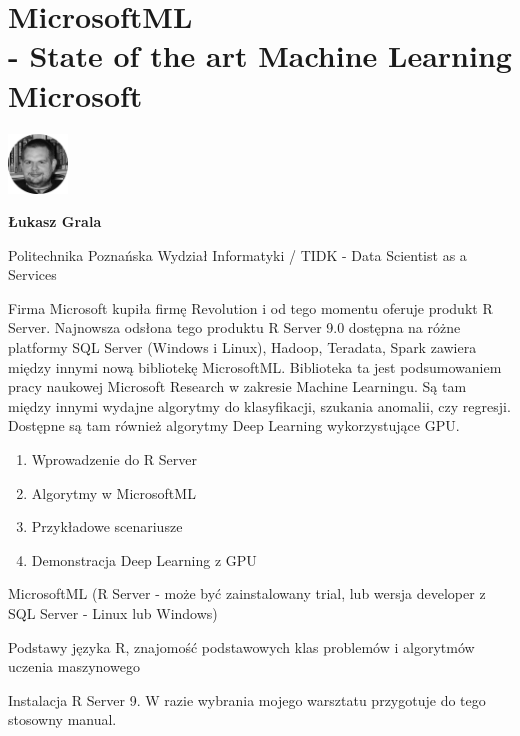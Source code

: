 \documentclass[\main/boa.tex]{subfiles}
\begin{document}
\section[MicrosoftML - State of the art Machine Learning Microsoft]{MicrosoftML \\- State of the art Machine Learning Microsoft}
\begin{minipage}[t]{0.915\textwidth}
	\center     
    \includegraphics[width=60px]{img/workshops/czarno_biale/lgrala-crop.png} 
\end{minipage}

\begin{minipage}{0.915\textwidth}
\centering
{\bf {} Łukasz Grala}
\end{minipage}

\vskip 0.3cm

\begin{affiliations}
\begin{minipage}{0.915\textwidth}
\centering
\large Politechnika Poznańska Wydział Informatyki / TIDK - Data Scientist as a Services  \\[2pt]
\end{minipage}
\end{affiliations}

\vskip 0.8cm

\opiswarsztatu Firma Microsoft kupiła firmę Revolution i od tego momentu oferuje produkt R Server. Najnowsza odsłona tego produktu R Server 9.0 dostępna na różne platformy SQL Server (Windows i Linux), Hadoop, Teradata, Spark zawiera między innymi nową bibliotekę MicrosoftML. Biblioteka ta jest podsumowaniem pracy naukowej Microsoft Research w zakresie Machine Learningu. Są tam między innymi wydajne algorytmy do klasyfikacji, szukania anomalii, czy regresji. Dostępne są tam również algorytmy Deep Learning wykorzystujące GPU.

\planwarsztatu
\begin{enumerate}
\item Wprowadzenie do R Server
\item Algorytmy w MicrosoftML
\item Przykładowe scenariusze
\item Demonstracja Deep Learning z GPU
\end{enumerate}	 

\pakiety MicrosoftML (R Server - może być zainstalowany trial, lub wersja developer z SQL Server - Linux lub Windows)

\umiejetnosci Podstawy języka R, znajomość podstawowych klas problemów i algorytmów uczenia maszynowego

\wymagania Instalacja R Server 9. W razie wybrania mojego warsztatu przygotuje do tego stosowny manual.
\end{document}
